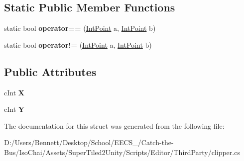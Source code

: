 \subsection*{Static Public Member Functions}
\begin{DoxyCompactItemize}
\item 
\mbox{\label{struct_super_tiled2_unity_1_1_editor_1_1_clipper_lib_1_1_int_point_a2aafc0751a636a924507988a655493e0}} 
static bool {\bfseries operator==} (\mbox{\hyperlink{struct_super_tiled2_unity_1_1_editor_1_1_clipper_lib_1_1_int_point}{Int\+Point}} a, \mbox{\hyperlink{struct_super_tiled2_unity_1_1_editor_1_1_clipper_lib_1_1_int_point}{Int\+Point}} b)
\item 
\mbox{\label{struct_super_tiled2_unity_1_1_editor_1_1_clipper_lib_1_1_int_point_ae8dd0d67a99c1483118b2a66671247c1}} 
static bool {\bfseries operator!=} (\mbox{\hyperlink{struct_super_tiled2_unity_1_1_editor_1_1_clipper_lib_1_1_int_point}{Int\+Point}} a, \mbox{\hyperlink{struct_super_tiled2_unity_1_1_editor_1_1_clipper_lib_1_1_int_point}{Int\+Point}} b)
\end{DoxyCompactItemize}
\subsection*{Public Attributes}
\begin{DoxyCompactItemize}
\item 
\mbox{\label{struct_super_tiled2_unity_1_1_editor_1_1_clipper_lib_1_1_int_point_a115ac23224a127250d880ebc1a45be46}} 
c\+Int {\bfseries X}
\item 
\mbox{\label{struct_super_tiled2_unity_1_1_editor_1_1_clipper_lib_1_1_int_point_ae7bc7211513643e33a33d63e06a619f6}} 
c\+Int {\bfseries Y}
\end{DoxyCompactItemize}


The documentation for this struct was generated from the following file\+:\begin{DoxyCompactItemize}
\item 
D\+:/\+Users/\+Bennett/\+Desktop/\+School/\+E\+E\+C\+S\+\_/\+Catch-\/the-\/\+Bus/\+Iso\+Chai/\+Assets/\+Super\+Tiled2\+Unity/\+Scripts/\+Editor/\+Third\+Party/clipper.\+cs\end{DoxyCompactItemize}
